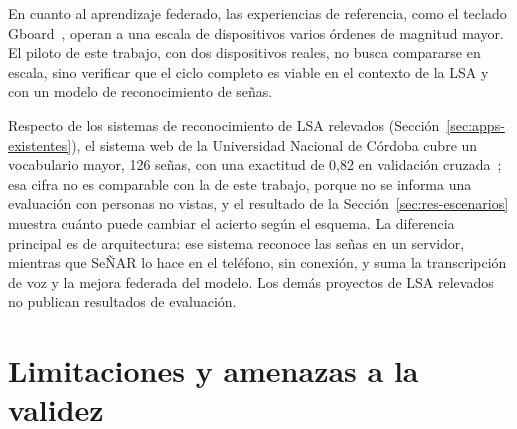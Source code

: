 En cuanto al aprendizaje federado, las experiencias de referencia, como el teclado Gboard~\cite{hard2018gboard}, operan a una escala de dispositivos varios órdenes de magnitud mayor. El piloto de este trabajo, con dos dispositivos reales, no busca compararse en escala, sino verificar que el ciclo completo es viable en el contexto de la LSA y con un modelo de reconocimiento de señas.

Respecto de los sistemas de reconocimiento de LSA relevados (Sección~\ref{sec:apps-existentes}), el sistema web de la Universidad Nacional de Córdoba cubre un vocabulario mayor, 126 señas, con una exactitud de 0,82 en validación cruzada~\cite{severini2025lsaweb}; esa cifra no es comparable con la de este trabajo, porque no se informa una evaluación con personas no vistas, y el resultado de la Sección~\ref{sec:res-escenarios} muestra cuánto puede cambiar el acierto según el esquema. La diferencia principal es de arquitectura: ese sistema reconoce las señas en un servidor, mientras que SeÑAR lo hace en el teléfono, sin conexión, y suma la transcripción de voz y la mejora federada del modelo. Los demás proyectos de LSA relevados no publican resultados de evaluación.

\section{Limitaciones y amenazas a la validez}

